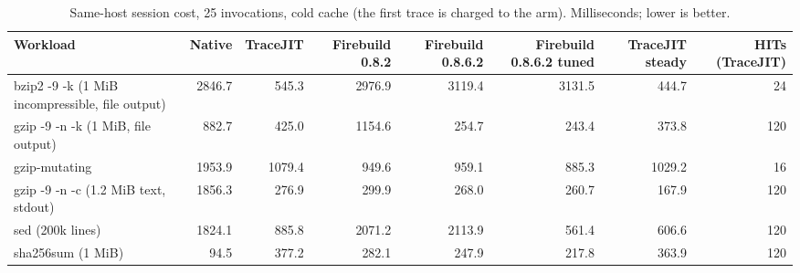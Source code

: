 \begin{table}[t]
\centering
\small
\caption{Same-host session cost, 25 invocations, cold cache (the first trace is charged to the arm). Milliseconds; lower is better.}
\label{tab:competitive}
\begin{tabular}{lrrrrrrr}
\toprule
\textbf{Workload} & \textbf{Native} & \textbf{TraceJIT} & \textbf{Firebuild 0.8.2} & \textbf{Firebuild 0.8.6.2} & \textbf{Firebuild 0.8.6.2 tuned} & \textbf{TraceJIT steady} & \textbf{HITs (TraceJIT)} \\
\midrule
bzip2 -9 -k (1 MiB incompressible, file output) & 2846.7 & 545.3 & 2976.9 & 3119.4 & 3131.5 & 444.7 & 24 \\
gzip -9 -n -k (1 MiB, file output) & 882.7 & 425.0 & 1154.6 & 254.7 & 243.4 & 373.8 & 120 \\
gzip-mutating & 1953.9 & 1079.4 & 949.6 & 959.1 & 885.3 & 1029.2 & 16 \\
gzip -9 -n -c (1.2 MiB text, stdout) & 1856.3 & 276.9 & 299.9 & 268.0 & 260.7 & 167.9 & 120 \\
sed (200k lines) & 1824.1 & 885.8 & 2071.2 & 2113.9 & 561.4 & 606.6 & 120 \\
sha256sum (1 MiB) & 94.5 & 377.2 & 282.1 & 247.9 & 217.8 & 363.9 & 120 \\
\bottomrule
\end{tabular}
\end{table}
